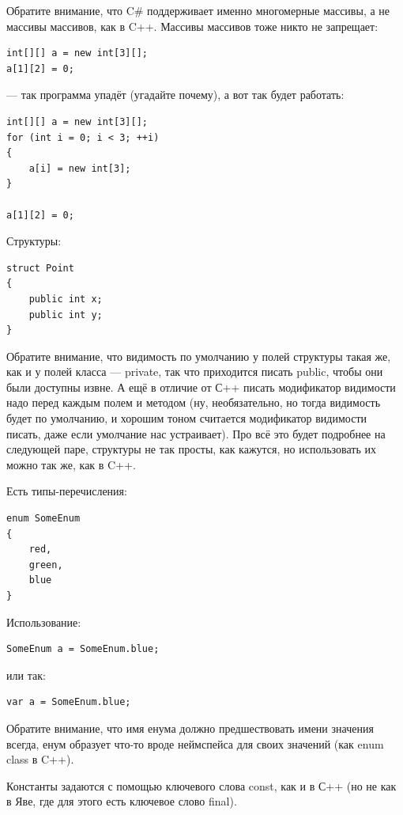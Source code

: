 \documentclass[a5paper]{article}
\begin{document}
Обратите внимание, что C\# поддерживает именно многомерные массивы, а не массивы массивов, как в C++. Массивы массивов тоже никто не запрещает:

\begin{verbatim}
int[][] a = new int[3][];
a[1][2] = 0;
\end{verbatim}

--- так программа упадёт (угадайте почему), а вот так будет работать:

\begin{verbatim}
int[][] a = new int[3][];
for (int i = 0; i < 3; ++i)
{
    a[i] = new int[3];
}

a[1][2] = 0;
\end{verbatim}

Структуры:

\begin{verbatim}
struct Point
{
    public int x;
    public int y;
}
\end{verbatim}

Обратите внимание, что видимость по умолчанию у полей структуры такая же, как и у полей класса --- private, так что приходится писать public, чтобы они были доступны извне. А ещё в отличие от С++ писать модификатор видимости надо перед каждым полем и методом (ну, необязательно, но тогда видимость будет по умолчанию, и хорошим тоном считается модификатор видимости писать, даже если умолчание нас устраивает). Про всё это будет подробнее на следующей паре, структуры не так просты, как кажутся, но использовать их можно так же, как в C++.

Есть типы-перечисления:

\begin{verbatim}
enum SomeEnum
{
    red,
    green,
    blue
}
\end{verbatim}

Использование:

\begin{verbatim}
SomeEnum a = SomeEnum.blue;
\end{verbatim}

или так:

\begin{verbatim}
var a = SomeEnum.blue;
\end{verbatim}

Обратите внимание, что имя енума должно предшествовать имени значения всегда, енум образует что-то вроде неймспейса для своих значений (как enum class в C++).

Константы задаются с помощью ключевого слова const, как и в С++ (но не как в Яве, где для этого есть ключевое слово final).
\end{document}
